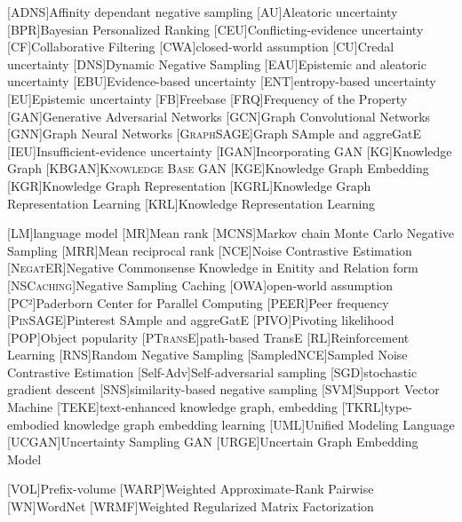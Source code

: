 \begin{acronym}[ECU]
[\textsc{ADNS}]{Affinity dependant negative sampling}
[AU]{Aleatoric uncertainty}
[BPR]{Bayesian Personalized Ranking}
[CEU]{Conflicting-evidence uncertainty}
[CF]{Collaborative Filtering}
[CWA]{closed-world assumption}
[CU]{Credal uncertainty}
[DNS]{Dynamic Negative Sampling}
[EAU]{Epistemic and aleatoric uncertainty}
[EBU]{Evidence-based uncertainty}
[ENT]{entropy-based uncertainty}
[EU]{Epistemic uncertainty}
[\textsc{FB}]{Freebase}
[\textsc{FRQ}]{Frequency of the Property}
[GAN]{Generative Adversarial Networks}
[GCN]{Graph Convolutional Networks}
[GNN]{Graph Neural Networks}
[\textsc{GraphSAGE}]{Graph SAmple and aggreGatE}
[IEU]{Insufficient-evidence uncertainty}
[\textsc{IGAN}]{Incorporating GAN}
[KG]{Knowledge Graph}
[\textsc{KBGAN}]{\textsc{Knowledge Base GAN}}
[KGE]{Knowledge Graph Embedding}
[KGR]{Knowledge Graph Representation}
[KGRL]{Knowledge Graph Representation Learning}
[KRL]{Knowledge Representation Learning}

[LM]{language model}
[MR]{Mean rank}
[\textsc{MCNS}]{Markov chain Monte Carlo Negative Sampling}
[MRR]{Mean reciprocal rank}
[NCE]{Noise Contrastive Estimation}
[\textsc{NegatER}]{Negative Commonsense Knowledge in Enitity and Relation form}
[\textsc{NSCaching}]{Negative Sampling Caching}
[OWA]{open-world assumption}
[PC²]{Paderborn Center for Parallel Computing}
[\textsc{PEER}]{Peer frequency}
[\textsc{PinSAGE}]{Pinterest SAmple and aggreGatE}
[\textsc{PIVO}]{Pivoting likelihood}
[\textsc{POP}]{Object popularity}
[\textsc{PTransE}]{path-based TransE}
[RL]{Reinforcement Learning}
[RNS]{Random Negative Sampling}
[SampledNCE]{Sampled Noise Contrastive Estimation}
[Self-Adv]{Self-adversarial sampling}
[SGD]{stochastic gradient descent}
[SNS]{similarity-based negative sampling}
[SVM]{Support Vector Machine}
[\textsc{TEKE}]{text-enhanced knowledge graph, embedding}
[\textsc{TKRL}]{type-embodied knowledge graph embedding learning}
[UML]{Unified Modeling Language}
[\textsc{UCGAN}]{Uncertainty Sampling GAN}
[\textsc{URGE}]{Uncertain Graph Embedding Model}

[\textsc{VOL}]{Prefix-volume}
[WARP]{Weighted Approximate-Rank Pairwise}
[\textsc{WN}]{WordNet}
[WRMF]{Weighted Regularized Matrix Factorization}
\end{acronym}